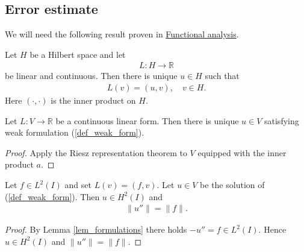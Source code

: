 \documentclass[12pt,oneside]{amsart}
\def\R{\mathbb R}
\begin{document}
\subsection{Error estimate}

We will need the following result proven in \href{https://studies.helsinki.fi/courses/cu/hy-CU-117627226-2021-08-01}{Functional analysis}.

\begin{theorem}\label{th_riesz}
Let $H$ be a Hilbert space and let 
    \begin{align*}
L : H \to \R
    \end{align*}
be linear and continuous. 
Then there is unique $u \in H$ such that 
    \begin{align*}
L(v) = (u,v), \quad v \in H.
    \end{align*}
Here $(\cdot,\cdot)$ is the inner product on $H$.
\end{theorem}

\begin{corollary}
Let $L : V \to \R$ be a continuous linear form. 
Then there is unique $u \in V$ satisfying weak formulation (\ref{def_weak_form}).
\end{corollary}
\begin{proof}
Apply the Riesz representation theorem to $V$ equipped with the inner product $a$.
\end{proof}

\begin{remark}\label{rem_hreg}
Let $f \in L^2(I)$ and set $L(v) = (f, v)$.
Let $u \in V$ be the solution of (\ref{def_weak_form}).
Then $u \in H^2(I)$ and 
    \begin{align*}
\|u''\| = \|f\|.
    \end{align*}
\end{remark}
\begin{proof}
By Lemma \ref{lem_formulations} there holds $-u'' = f \in L^2(I)$. Hence $u \in H^2(I)$ and $\|u''\| = \|f\|$.
\end{proof}
\end{document}
